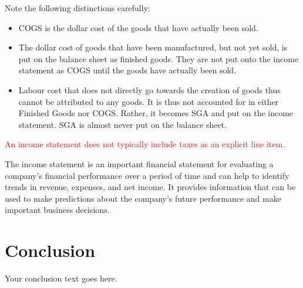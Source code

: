 \documentclass{article}
\begin{document}
Note the following distinctions carefully:
\begin{itemize}
    \item COGS is the dollar cost of the goods that have actually been sold.
    \item The dollar cost of goods that have been manufactured, but not yet sold, is put on the balance sheet as finished goods. They are not put onto the income statement as COGS until the goods have actually been sold.
    \item Labour cost that does not directly go towards the creation of goods thus cannot be attributed to any goods. It is thus not accounted for in either Finished Goods nor COGS. Rather, it becomes SGA and put on the income statement. SGA is almost never put on the balance sheet. 
\end{itemize}

\textcolor{red}{An income statement does not typically include taxes as an explicit line item.}

The income statement is an important financial statement for evaluating a company's financial performance over a period of time and can help to identify trends in revenue, expenses, and net income. It provides information that can be used to make predictions about the company's future performance and make important business decisions.

\section{Conclusion}

Your conclusion text goes here.
\end{document}
